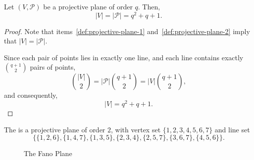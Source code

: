 \begin{theorem}
    Let \((V, \mathcal{P})\) be a projective plane of order \(q\).
    Then,
    \begin{equation}
        |V| = |\mathcal{P}| = q^2 + q + 1.
    \end{equation}
\end{theorem}

\begin{proof}
    Note that items~\ref{def:projective-plane-1} and~\ref{def:projective-plane-2} imply that \(|V| = |\mathcal{P}|\).

    Since each pair of points lies in exactly one line,
    and each line contains exactly \(\binom{q+1}{2}\) pairs of points,
    \begin{equation}
        \binom{|V|}{2} = |\mathcal{P}| \binom{q+1}{2} = |V| \binom{q+1}{2},
    \end{equation}
    and consequently,
    \begin{equation}
        |V| = q^2 + q + 1.
    \end{equation}
\end{proof}

\begin{example}
    The  is a projective plane of order \(2\),
    with vertex set \(\{1, 2, 3, 4, 5, 6, 7\}\) and line set
    \begin{equation}
        \Big\{
            \{1, 2, 6\},
            \{1, 4, 7\},
            \{1, 3, 5\},
            \{2, 3, 4\},
            \{2, 5, 7\},
            \{3, 6, 7\},
            \{4, 5, 6\}
        \Big\}.
    \end{equation}
\end{example}

\begin{figure}[ht]
    \centering
    \caption{The Fano Plane}
\end{figure}

